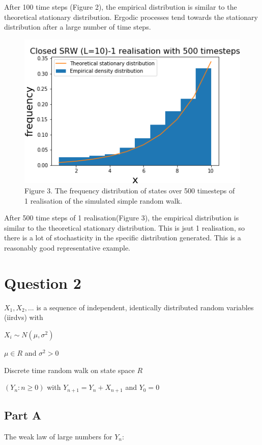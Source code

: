 \documentclass{article}
\begin{document}
After 100 time steps (Figure 2), the empirical distribution is similar to the theoretical stationary distribution. Ergodic processes tend towards the stationary distribution after a large number of time steps.


\begin{figure}
\includegraphics[scale=0.5]{500_steps_a.png} 
\small{Figure 3. The frequency distribution of states over 500 timesteps of 1 realisation of the simulated simple random walk.}
\end{figure}

After 500 time steps of 1 realisation(Figure 3), the empirical distribution is similar to the theoretical stationary distribution. This is jsut 1 realisation, so there is a lot of stochasticity in the specific distribution generated. This is a reasonably good representative example.



\section{Question 2}

$X_1, X_2, ... $ is a sequence of independent, identically distributed random variables (iirdvs) with 

$X_i \sim N(\mu, \sigma^2)$ 

$\mu \in {R}$ and $\sigma^2 > 0$

Discrete time random walk on state space ${R}$

$(Y_n : n \geq 0)$ with $Y_{n+1} = Y_n + X_{n+1}$ and $Y_0 = 0$


\subsection{Part A}

The weak law of large numbers for $Y_n$:
\end{document}

